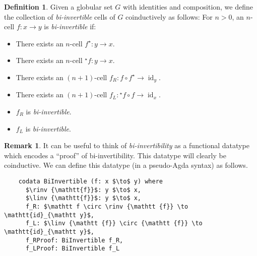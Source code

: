 \documentclass{article}
\theoremstyle{definition}
\newtheorem{definition}{Definition}
\newtheorem{remark}{Remark}
\theoremstyle{examplestyle}
\DeclareMathOperator{\id}{id}
\newcommand{\linv}[1]{{}^\star\!#1}
\newcommand{\rinv}[1]{#1^\star}
\begin{document}
\begin{definition}
  Given a globular set \(G\) with identities and composition, we define the collection of \emph{bi-invertible} cells of \(G\) coinductively as follows: For \(n > 0\), an \(n\)-cell \(f: x \to y\) is \emph{bi-invertible} if:
  \begin{itemize}
  \item There exists an \(n\)-cell \(\rinv f: y \to x\).
  \item There exists an \(n\)-cell \(\linv f: y \to x\).
  \item There exists an \((n+1)\)-cell \(f_R: f \circ \rinv f \to \id_y\).
  \item There exists an \((n+1)\)-cell \(f_L: \linv f \circ f \to \id_x\).
  \item \(f_R\) is \emph{bi-invertible}.
  \item \(f_L\) is \emph{bi-invertible}.
  \end{itemize}
\end{definition}

\begin{remark}
  It can be useful to think of \emph{bi-invertibility} as a functional datatype which encodes a ``proof'' of bi-invertibility. This datatype will clearly be coinductive. We can define this datatype (in a pseudo-Agda syntax) as follows.

  \begin{lstlisting}
    codata BiInvertible (f: x $\to$ y) where
      $\rinv {\mathtt{f}}$: y $\to$ x,
      $\linv {\mathtt{f}}$: y $\to$ x,
      f_R: $\mathtt f \circ \rinv {\mathtt {f}} \to \mathtt{id}_{\mathtt y}$,
      f_L: $\linv {\mathtt {f}} \circ {\mathtt {f}} \to \mathtt{id}_{\mathtt y}$,
      f_RProof: BiInvertible f_R,
      f_LProof: BiInvertible f_L
  \end{lstlisting}
\end{remark}
\end{document}
